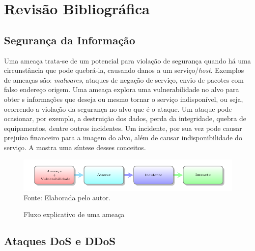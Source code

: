\chapter[Revisão Bibliográfica]{Revisão Bibliográfica}
\section{Segurança da Informação}
Uma ameaça trata-se de um potencial para violação de segurança quando há uma circunstância que pode quebrá-la, causando danos a um serviço/\textit{host}. Exemplos de ameaças são: \textit{malwares}, ataques de negação de serviço, envio de pacotes com falso endereço origem. Uma ameaça explora uma vulnerabilidade no alvo para obter s informações que deseja ou mesmo tornar o serviço indisponível, ou seja, ocorrendo a violação da segurança no alvo que é o ataque. Um ataque pode ocasionar, por exemplo, a destruição dos dados, perda da integridade, quebra de equipamentos, dentre outros incidentes. Um incidente, por sua vez pode causar prejuízo financeiro para a imagem do alvo, além de causar indisponibilidade do serviço. A  mostra uma síntese desses conceitos.   

 \begin{figure}[ht]
 	\centering
 	\caption{Fluxo explicativo de uma ameaça }
 	\includegraphics[width=1\textwidth]{figs/ameacas.pdf}\\
 	{Fonte: Elaborada pelo autor.}
 	\label{fig:ameacas}
 \end{figure}
 
 \section{Ataques DoS e DDoS}

